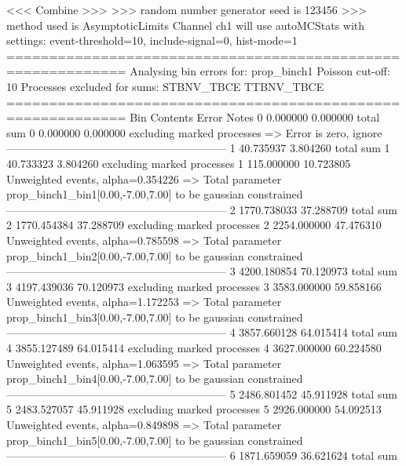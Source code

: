  <<< Combine >>> 
>>> random number generator seed is 123456
>>> method used is AsymptoticLimits
Channel ch1 will use autoMCStats with settings: event-threshold=10, include-signal=0, hist-mode=1
============================================================
Analysing bin errors for: prop_binch1
Poisson cut-off: 10
Processes excluded for sums: STBNV_TBCE TTBNV_TBCE
============================================================
Bin        Contents        Error           Notes                         
0          0.000000        0.000000        total sum                     
0          0.000000        0.000000        excluding marked processes    
  => Error is zero, ignore      
------------------------------------------------------------
1          40.735937       3.804260        total sum                     
1          40.733323       3.804260        excluding marked processes    
1          115.000000      10.723805       Unweighted events, alpha=0.354226
  => Total parameter prop_binch1_bin1[0.00,-7.00,7.00] to be gaussian constrained
------------------------------------------------------------
2          1770.738033     37.288709       total sum                     
2          1770.454384     37.288709       excluding marked processes    
2          2254.000000     47.476310       Unweighted events, alpha=0.785598
  => Total parameter prop_binch1_bin2[0.00,-7.00,7.00] to be gaussian constrained
------------------------------------------------------------
3          4200.180854     70.120973       total sum                     
3          4197.439036     70.120973       excluding marked processes    
3          3583.000000     59.858166       Unweighted events, alpha=1.172253
  => Total parameter prop_binch1_bin3[0.00,-7.00,7.00] to be gaussian constrained
------------------------------------------------------------
4          3857.660128     64.015414       total sum                     
4          3855.127489     64.015414       excluding marked processes    
4          3627.000000     60.224580       Unweighted events, alpha=1.063595
  => Total parameter prop_binch1_bin4[0.00,-7.00,7.00] to be gaussian constrained
------------------------------------------------------------
5          2486.801452     45.911928       total sum                     
5          2483.527057     45.911928       excluding marked processes    
5          2926.000000     54.092513       Unweighted events, alpha=0.849898
  => Total parameter prop_binch1_bin5[0.00,-7.00,7.00] to be gaussian constrained
------------------------------------------------------------
6          1871.659059     36.621624       total sum                     

